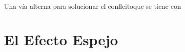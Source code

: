\subsection{}

Una vía alterna para solucionar el conflcitoque se tiene con 








\section{El Efecto Espejo}



